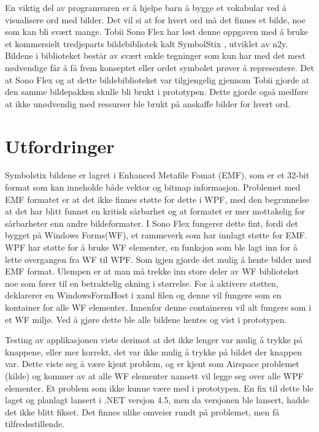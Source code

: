 { 
 
 
En viktig del av programvaren er å hjelpe barn å bygge et vokabular ved å visualisere ord med bilder. Det vil si at for hvert ord må det finnes et bilde, noe som kan bli svært mange. Tobii Sono Flex har løst denne oppgaven med å bruke et kommersielt tredjeparts bildebibliotek kalt SymbolStix \cite{n2y}, utviklet av n2y. Bildene i biblioteket består av svært enkle tegninger som kun har med det mest nødvendige får å få frem konseptet eller ordet symbolet prøver å representere. Det at Sono Flex og at dette bildebiblioteket var tilgjengelig gjennom Tobii gjorde at den samme bildepakken skulle bli brukt i prototypen. Dette gjorde også medføre at ikke unødvendig med ressurser ble brukt på anskaffe bilder for hvert ord. 



\section{Utfordringer}

 
Symbolstix bildene er lagret i Enhanced Metafile Fomat (EMF), som er et 32-bit format som kan inneholde både vektor og bitmap informasjon\cite{AboutEMF}. Problemet med EMF formatet er at det ikke finnes støtte for dette i WPF, med den begrunnelse at det har blitt funnet en kritisk sårbarhet\cite{EMFVulnerability} og at formatet er mer mottakelig for sårbarheter\cite{EMFForum} enn andre bildeformater. I Sono Flex fungerer dette fint, fordi det bygget på Windows Forms(WF),  et rammeverk som har innlagt støtte for EMF. WPF har støtte for å bruke WF elementer,  en funksjon som ble lagt inn for å lette overgangen fra WF til WPF. Som igjen gjorde det mulig å hente bilder med EMF format. Ulempen er at man må trekke inn store deler av WF biblioteket noe som fører til en betraktelig økning i størrelse. For å aktivere støtten, deklarerer en WindowsFormHost i xaml filen og denne vil fungere som en kontainer for alle WF elementer. Innenfor denne containeren vil alt fungere som i et WF miljø. Ved å gjøre dette ble alle bildene hentes og vist i prototypen.  
 
Testing av applikasjonen viste derimot at det ikke lenger var mulig å trykke på knappene, eller mer korrekt, det var ikke mulig å trykke på  bildet der knappen var. Dette viste seg å være kjent problem, og er kjent som Airspace problemet (kilde) og kommer av at alle WF elementer uansett vil legge seg over alle WPF elementer. Et problem som ikke kunne være med i prototypen. En fix til dette ble laget og planlagt lansert i .NET versjon 4.5, men da versjonen ble lansert, hadde det ikke blitt fikset. Det finnes ulike omveier rundt på problemet, men få tilfredsstillende.  
 
}
